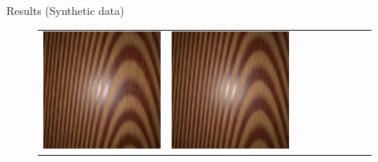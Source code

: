 \documentclass[final]{beamer}
\newlength{\twocolwid}
\newlength{\resultwidth}
\begin{document}
\begin{frame}[t]
\begin{columns}[t]
\begin{column}{\twocolwid}
\begin{block}{Results (Synthetic data)}
\begin{figure}[t]
\begin{tabular}{ccrclcccc}
            		\includegraphics[width=\resultwidth]{images/synth/wood/good1.jpg} &
            		\includegraphics[width=\resultwidth]{images/synth/wood/good2.jpg} &

\end{tabular}
\end{figure}
\end{block}
\end{column}
\end{columns}
\end{frame}
\end{document}
